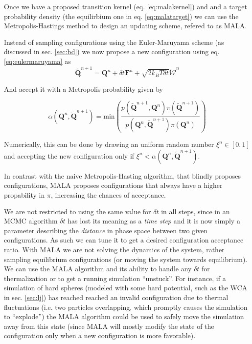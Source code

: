 \documentclass[ twoside,openright,titlepage,numbers=noenddot,%
headinclude,footinclude,cleardoublepage=empty,abstract=on,
BCOR=5mm,paper=a4,fontsize=11pt, dvipsnames
]{scrreprt}
\renewcommand{\vec}[1]{\bm{#1}}
\newcommand{\dt}{\delta t}
\newcommand{\kT}{k_B T}
\begin{document}
Once we have a proposed transition kernel (eq. \eqref{eq:malakernel}) and and a target probability density (the equilirbium one in eq. \eqref{eq:malatarget}) we can use the Metropolis-Hastings method to design an updating scheme, refered to as MALA\cite{Roberts1996}\cite{Besag1994}.

Instead of sampling configurations using the Euler-Maruyama scheme (as discussed in sec. \ref{sec:bd}) we now propose a new configuration using eq. \eqref{eq:eulermaruyama} as
\begin{equation}
  \widetilde{\vec{Q}}^{n+1} = \vec{Q}^n + \dt\vec{F}^n + \sqrt{2\kT\dt}\vec{\widetilde{\mathcal{W}}}^n
\end{equation}

And accept it with a Metropolis probability given by

\begin{equation}
  \alpha(\vec{Q}^n, \widetilde{\vec{Q}}^{n+1}) = \text{min}\left(\frac{p(\widetilde{\vec{Q}}^{n+1},\vec{Q}^{n})\pi(\widetilde{\vec{Q}}^{n+1})}{p(\vec{Q}^{n}, \widetilde{\vec{Q}}^{n+1})\pi(\vec{Q}^{n})}\right)
\end{equation}

Numerically, this can be done by drawing an uniform random number $\xi^n \in [0,1]$ and accepting the new configuration only if $\xi^n<\alpha(\vec{Q}^n, \widetilde{\vec{Q}}^{n+1})$.

In contrast with the naive Metropolis-Hasting algorithm, that blindly proposes configurations, MALA proposes configurations that always have a higher propability in $\pi$, increasing the chances of acceptance.

We are not restricted to using the same value for $\dt$ in all steps, since in an MCMC algorithm $\dt$ has lost its meaning as a \emph{time step} and it is now simply a parameter describing the \emph{distance} in phase space between two given configurations. As such we can tune it to get a desired configuration acceptance ratio.
With MALA we are not solving the dynamics of the system, rather sampling equilibrium configurations (or moving the system towards equilibrium). We can use the MALA algorithm and its ability to handle any $\dt$ for thermalization or to get a running simulation ``unstuck''. For instance, if a simulation of hard spheres (modeled with some hard potential, such as the WCA in sec. \ref{sec:lj}) has reached reached an invalid configuration due to thermal fluctuations (i.e. two particles overlapping, which promptly causes the simulation to ``explode'') the MALA algorithm could be used to safely move the simulation away from this state (since MALA will mostly modify the state of the configuration only when a new configuration is more favorable).
\end{document}
